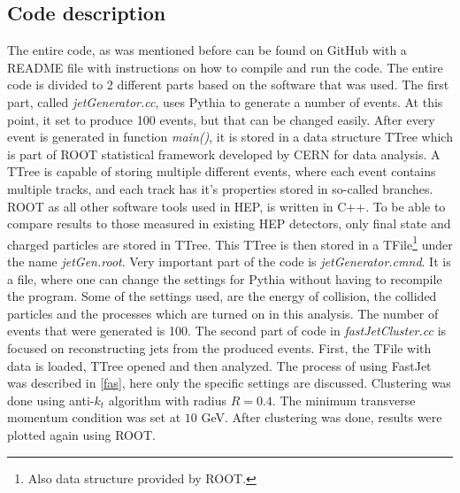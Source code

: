 \documentclass[a4paper,10pt]{article}
\begin{document}
\subsection{Code description}
\label{code}
The entire code, as was mentioned before can be found on GitHub\cite{GitHubJets} with a README file with instructions on how to compile and run the code. The entire code is divided to 2 different parts based on the software that was used. The first part, called \textit{jetGenerator.cc}, uses Pythia to generate a number of events. At this point, it set to produce 100 events, but that can be changed easily. After every event is generated in function \textit{main()}, it is stored in a data structure TTree which is part of ROOT statistical framework developed by CERN for data analysis. A TTree is capable of storing multiple different events, where each event contains multiple tracks, and each track has it's properties stored in so-called branches\cite{CERN2018ROOT}. ROOT as all other software tools used in HEP, is written in C++. 
\newline
\noindent To be able to compare results to those measured in existing HEP detectors, only final state and charged particles are stored in TTree. This TTree is then stored in a TFile\footnote{Also data structure provided by ROOT. } under the name \textit{jetGen.root}. Very important part of the code is \textit{jetGenerator.cmnd}. It is a file, where one can change the settings for Pythia without having to recompile the program. Some of the settings used, are the energy of collision, the collided particles and the processes which are turned on in this analysis. The number of events that were generated is 100.
\newline
\noindent The second part of code in \textit{fastJetCluster.cc} is focused on reconstructing jets from the produced events. First, the TFile with data is loaded, TTree opened and then analyzed. The process of using FastJet was described in \autoref{fas}, here only the specific settings are discussed. Clustering was done using anti-$k_t$ algorithm with radius $R=0.4$. The minimum transverse momentum condition was set at $10$ GeV. After clustering was done, results were plotted again using ROOT. 
\end{document}
